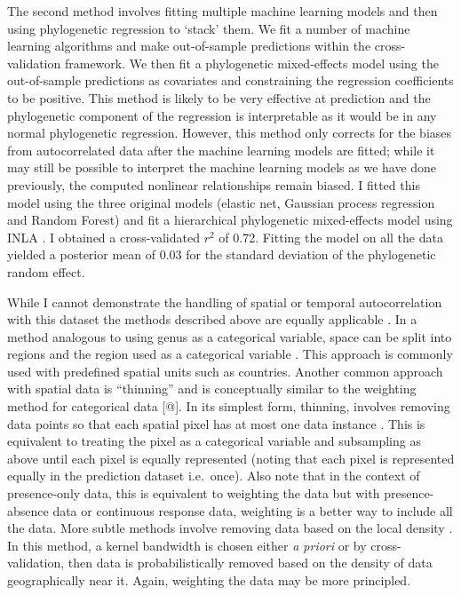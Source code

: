 \documentclass[10pt,]{article}
\begin{document}
The second method involves fitting multiple machine learning models and then using phylogenetic regression to `stack' them. We fit a number of machine learning algorithms and make out-of-sample predictions within the cross-validation framework. We then fit a phylogenetic mixed-effects model using the out-of-sample predictions as covariates and constraining the regression coefficients to be positive. This method is likely to be very effective at prediction and the phylogenetic component of the regression is interpretable as it would be in any normal phylogenetic regression. However, this method only corrects for the biases from autocorrelated data after the machine learning models are fitted; while it may still be possible to interpret the machine learning models as we have done previously, the computed nonlinear relationships remain biased. I fitted this model using the three original models (elastic net, Gaussian process regression and Random Forest) and fit a hierarchical phylogenetic mixed-effects model using INLA \citep{INLA}. I obtained a cross-validated \(r^2\) of 0.72. Fitting the model on all the data yielded a posterior mean of 0.03 for the standard deviation of the phylogenetic random effect.

While I cannot demonstrate the handling of spatial or temporal autocorrelation with this dataset the methods described above are equally applicable \citep{elith2009species}. In a method analogous to using genus as a categorical variable, space can be split into regions and the region used as a categorical variable \citep{appelhans2015evaluating}. This approach is commonly used with predefined spatial units such as countries. Another common approach with spatial data is ``thinning'' and is conceptually similar to the weighting method for categorical data {[}@{]}. In its simplest form, thinning, involves removing data points so that each spatial pixel has at most one data instance \citep{elith2010art, verbruggen2013improving}. This is equivalent to treating the pixel as a categorical variable and subsampling as above until each pixel is equally represented (noting that each pixel is represented equally in the prediction dataset i.e.~once). Also note that in the context of presence-only data, this is equivalent to weighting the data but with presence-absence data or continuous response data, weighting is a better way to include all the data. More subtle methods involve removing data based on the local density \citep{verbruggen2013improving}. In this method, a kernel bandwidth is chosen either \emph{a priori} or by cross-validation, then data is probabilistically removed based on the density of data geographically near it. Again, weighting the data may be more principled.
\end{document}
